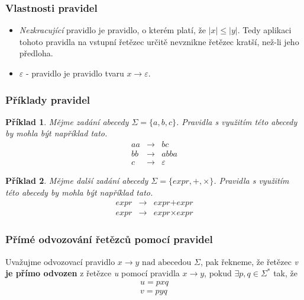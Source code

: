 \documentclass[10pt, a4paper, titlepage]{article}
\theoremstyle{note}
\newtheorem{priklad}{Příklad}
\begin{document}
\subsubsection{Vlastnosti pravidel}
\begin{itemize}
\item \emph{Nezkracující} pravidlo je pravidlo, o kterém platí, že $|x| \leq |y|$. Tedy aplikaci tohoto pravidla na vstupní řetězec určitě nevznikne řetězec kratší, než-li jeho předloha.

\item $\varepsilon$ - pravidlo je pravidlo tvaru $x \rightarrow \varepsilon$.
\end{itemize}

\subsubsection{Příklady pravidel}
\begin{priklad}
Mějme zadání abecedy $\Sigma = \lbrace a,b,c \rbrace$. Pravidla s využitím této abecedy by mohla být například tato.
\begin{eqnarray*}
aa &\rightarrow& bc \\
bb &\rightarrow& abba \\
c &\rightarrow& \varepsilon
\end{eqnarray*}
\end{priklad}

\begin{priklad}
Mějme další zadání abecedy $\Sigma = \lbrace expr, +, \times \rbrace$. Pravidla s využitím této abecedy by mohla být například tato.
\begin{eqnarray*}
\textit{expr} &\rightarrow& \textit{expr} + \textit{expr} \\
\textit{expr} &\rightarrow& \textit{expr} \times \textit{expr}
\end{eqnarray*}
\end{priklad}

\subsubsection{Přímé odvozování řetězců pomocí pravidel}
Uvažujme odvozovací pravidlo $ x \rightarrow y \text{ nad abecedou } \Sigma$, pak řekneme, že řetězec \emph{v} \textbf{je přímo odvozen}
z řetězce \emph{u} pomocí pravidla $ x \rightarrow y $, pokud $\exists p, q \in \Sigma^{*}$ tak, že
\begin{gather*}
u = p x q \\
v = p y q
\end{gather*}
\end{document}
